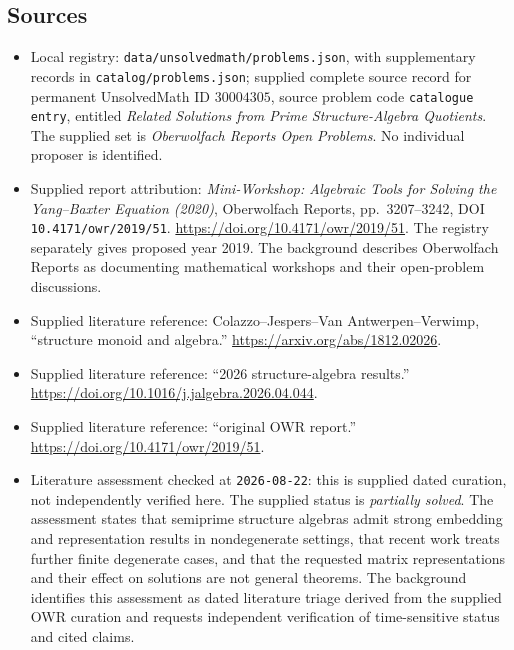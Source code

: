 \documentclass[11pt]{article}
\begin{document}
\subsection{Sources}
\begin{itemize}
\item Local registry: \texttt{data/unsolvedmath/problems.json}, with supplementary records in \texttt{catalog/problems.json}; supplied complete source record for permanent UnsolvedMath ID \(30004305\), source problem code \texttt{catalogue entry}, entitled \emph{Related Solutions from Prime Structure-Algebra Quotients}. The supplied set is \emph{Oberwolfach Reports Open Problems}. No individual proposer is identified.
\item Supplied report attribution: \emph{Mini-Workshop: Algebraic Tools for Solving the Yang--Baxter Equation (2020)}, Oberwolfach Reports, pp.\ 3207--3242, DOI \texttt{10.4171/owr/2019/51}. \url{https://doi.org/10.4171/owr/2019/51}. The registry separately gives proposed year 2019. The background describes Oberwolfach Reports as documenting mathematical workshops and their open-problem discussions.
\item Supplied literature reference: Colazzo--Jespers--Van Antwerpen--Verwimp, ``structure monoid and algebra.'' \url{https://arxiv.org/abs/1812.02026}.
\item Supplied literature reference: ``2026 structure-algebra results.'' \url{https://doi.org/10.1016/j.jalgebra.2026.04.044}.
\item Supplied literature reference: ``original OWR report.'' \url{https://doi.org/10.4171/owr/2019/51}.
\item Literature assessment checked at \texttt{2026-08-22}: this is supplied dated curation, not independently verified here. The supplied status is \emph{partially solved}. The assessment states that semiprime structure algebras admit strong embedding and representation results in nondegenerate settings, that recent work treats further finite degenerate cases, and that the requested matrix representations and their effect on solutions are not general theorems. The background identifies this assessment as dated literature triage derived from the supplied OWR curation and requests independent verification of time-sensitive status and cited claims.
\end{itemize}
\end{document}

